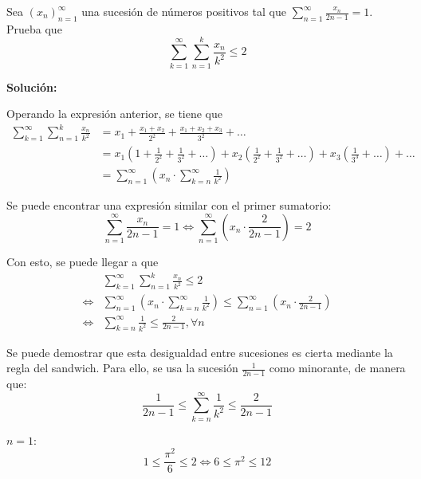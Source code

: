 \documentclass[../../main.tex]{subfiles}
\begin{document}
  \begin{shaded}
    Sea $(x_n)_{n = 1}^\infty$ una sucesión de números positivos tal que $\displaystyle\sum_{n = 1}^\infty \displaystyle\frac{x_n}{2n - 1} = 1$. Prueba que
    $$
    \sum_{k = 1}^\infty \sum_{n = 1}^k \frac{x_n}{k^2} \leq 2
    $$

    \end{shaded}

  \textbf{Solución:}

  Operando la expresión anterior, se tiene que
  \begin{equation*}
    \begin{split}
      \sum_{k = 1}^\infty \sum_{n = 1}^k \frac{x_n}{k^2} & =
      x_1 + \frac{x_1 + x_2}{2^2} + \frac{x_1 + x_2 + x_3}{3^2} + \dots \\ & =
      x_1 \left(1 + \frac{1}{2^2} + \frac{1}{3^2} + \dots \right) + x_2 \left(\frac{1}{2^2} + \frac{1}{3^2} + \dots \right) + x_3 \left(\frac{1}{3^3} + \dots\right) + \dots \\ & =
      \sum_{n = 1}^\infty \left(x_n \cdot \sum_{k = n}^\infty \frac{1}{k^2} \right)
    \end{split}
  \end{equation*}

  Se puede encontrar una expresión similar con el primer sumatorio:
  $$
  \sum_{n = 1}^\infty \frac{x_n}{2n - 1} = 1
  \iff
  \sum_{n = 1}^\infty \left(x_n \cdot \frac{2}{2n -1}\right) = 2
  $$

  Con esto, se puede llegar a que 
  \begin{equation*}
    \begin{split}
    & \sum_{k = 1}^\infty \sum_{n = 1}^k \frac{x_n}{k^2} \leq 2 \\ \iff
    & \sum_{n = 1}^\infty \left(x_n \cdot \sum_{k = n}^\infty \frac{1}{k^2} \right) \leq \sum_{n = 1}^\infty \left(x_n \cdot \frac{2}{2n - 1}\right) \\ \iff
    & \sum_{k = n}^\infty \frac{1}{k^2} \leq \frac{2}{2n -1}, \forall n
    \end{split}
  \end{equation*}

  \newpage
  Se puede demostrar que esta desigualdad entre sucesiones es cierta mediante la regla del sandwich. Para ello, se usa la sucesión $\displaystyle\frac{1}{2n - 1}$ como minorante, de manera que:
  $$
  \frac{1}{2n - 1} \leq \sum_{k = n}^\infty \frac{1}{k^2} \leq \frac{2}{2n - 1}
  $$

  $n = 1$:
  $$
  1 \leq \frac{\pi^2}{6} \leq 2
  \iff
  6 \leq \pi^2 \leq 12
  $$
\end{document}
